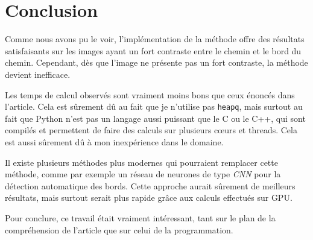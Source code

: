 \documentclass{article}
\begin{document}
\section{Conclusion}

Comme nous avons pu le voir, l'implémentation de la méthode offre des résultats
satisfaisants sur les images ayant un fort contraste entre le chemin et le bord
du chemin. Cependant, dès que l'image ne présente pas un fort contraste, la méthode
devient inefficace.

Les temps de calcul observés sont vraiment moins bons que ceux énoncés dans l'article.
Cela est sûrement dû au fait que je n'utilise pas \texttt{heapq}, mais surtout au fait que Python
n'est pas un langage aussi puissant que le C ou le C++, qui sont compilés et permettent 
de faire des calculs sur plusieurs cœurs et threads. Cela est aussi sûrement dû 
à mon inexpérience dans le domaine.

Il existe plusieurs méthodes plus modernes qui pourraient remplacer cette méthode,
comme par exemple un réseau de neurones de type \textit{CNN} pour la détection automatique des bords.
Cette approche aurait sûrement de meilleurs résultats, mais surtout serait plus rapide grâce
aux calculs effectués sur GPU.

Pour conclure, ce travail était vraiment intéressant, tant sur le plan de la compréhension
de l'article que sur celui de la programmation.
\end{document}
